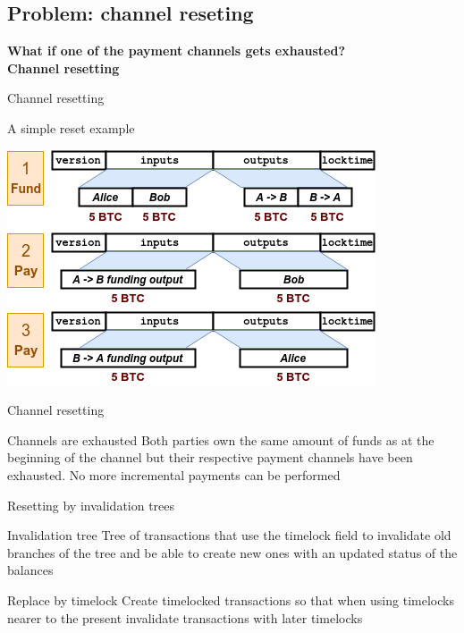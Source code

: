 \documentclass{beamer}
\begin{document}
\subsection{Problem: channel reseting}
\begin{frame}
 \begin{center}
  \textbf{What if one of the payment channels gets exhausted?}\\
  \huge\textbf{Channel resetting}
 \end{center}
\end{frame}
\begin{frame}{Channel resetting}
 \begin{exampleblock}{A simple reset example}
  \begin{center}
   \includegraphics[width=\textwidth, height=0.8\textheight, keepaspectratio]{img/bidir_reset.png}
  \end{center}
 \end{exampleblock}
\end{frame}
\begin{frame}{Channel resetting}
 \begin{alertblock}{Channels are exhausted}
  Both parties own the same amount of funds as at the beginning of the channel but their respective payment channels have been exhausted. No more incremental payments can be performed
 \end{alertblock}
\end{frame}
\begin{frame}{Resetting by invalidation trees}
 \begin{block}{Invalidation tree}
  Tree of transactions that use the timelock field to invalidate old branches of the tree and be able to create new ones with an updated status of the balances
 \end{block}
 \begin{block}{Replace by timelock}
  Create timelocked transactions so that when using timelocks nearer to the present invalidate transactions with later timelocks
 \end{block}
\end{frame}
\end{document}
